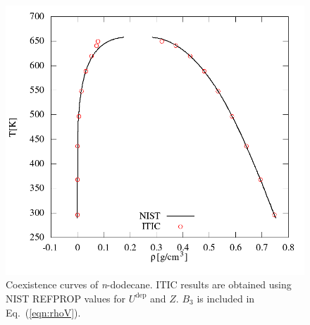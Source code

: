 \documentclass[5p,times]{elsarticle}
\begin{document}
\begin{figure}
\includegraphics[scale=0.4]{Figures/NIST-VAL_FTT_trho.png}
\caption{Coexistence curves of \textit{n}-dodecane. ITIC results are obtained using NIST REFPROP values \cite{Lemmon2004} for $U^{\mathrm{dep}}$ and $Z$. $B_3$ is included in Eq.~(\ref{eqn:rhoV}).}
\label{fig:NIST-VAL-C12-FTT_BINODAL}
\end{figure}
\end{document}
